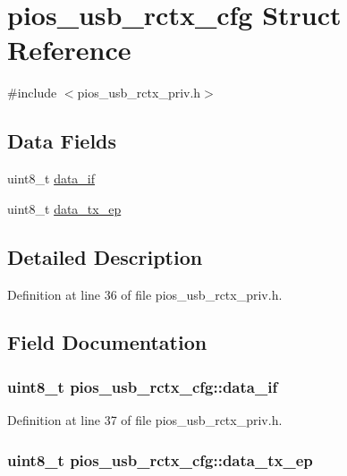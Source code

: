 \hypertarget{structpios__usb__rctx__cfg}{\section{pios\-\_\-usb\-\_\-rctx\-\_\-cfg \-Struct \-Reference}
\label{structpios__usb__rctx__cfg}
}


{\ttfamily \#include $<$pios\-\_\-usb\-\_\-rctx\-\_\-priv.\-h$>$}

\subsection*{\-Data \-Fields}
\begin{DoxyCompactItemize}
\item 
uint8\-\_\-t \hyperlink{structpios__usb__rctx__cfg_a4b8d76465e724b69a2fdeb4ebf0c9560}{data\-\_\-if}
\item 
uint8\-\_\-t \hyperlink{structpios__usb__rctx__cfg_ae5eb2a2117797f91ee47f0535032cd54}{data\-\_\-tx\-\_\-ep}
\end{DoxyCompactItemize}


\subsection{\-Detailed \-Description}


\-Definition at line 36 of file pios\-\_\-usb\-\_\-rctx\-\_\-priv.\-h.



\subsection{\-Field \-Documentation}
\hypertarget{structpios__usb__rctx__cfg_a4b8d76465e724b69a2fdeb4ebf0c9560}{
\subsubsection[{data\-\_\-if}]{\setlength{\rightskip}{0pt plus 5cm}uint8\-\_\-t {\bf pios\-\_\-usb\-\_\-rctx\-\_\-cfg\-::data\-\_\-if}}}\label{structpios__usb__rctx__cfg_a4b8d76465e724b69a2fdeb4ebf0c9560}


\-Definition at line 37 of file pios\-\_\-usb\-\_\-rctx\-\_\-priv.\-h.

\hypertarget{structpios__usb__rctx__cfg_ae5eb2a2117797f91ee47f0535032cd54}{
\subsubsection[{data\-\_\-tx\-\_\-ep}]{\setlength{\rightskip}{0pt plus 5cm}uint8\-\_\-t {\bf pios\-\_\-usb\-\_\-rctx\-\_\-cfg\-::data\-\_\-tx\-\_\-ep}}}\label{structpios__usb__rctx__cfg_ae5eb2a2117797f91ee47f0535032cd54}



